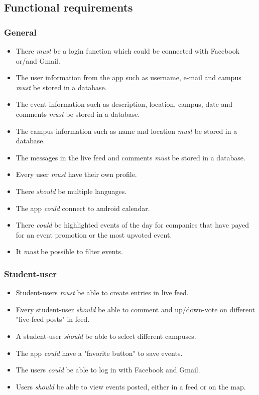 \documentclass[12pt, oneside]{article}   	%
\begin{document}
\subsection*{Functional requirements}

\subsubsection*{General}
\begin{itemize}
\item There \textit{must} be a login function which could be connected with Facebook or/and Gmail.
\item The user information from the app such as username, e-mail and campus \textit{must} be stored in a database.\item The event information such as description, location, campus, date and comments \textit{must} be stored in a database.
\item The campus information such as name and location \textit{must} be stored in a database. 
\item The messages in the live feed and comments \textit{must} be stored in a database. 
\item Every user \textit{must} have their own profile.
\item There \textit{should} be multiple languages.
\item The app \textit{could} connect to android calendar. 
\item There \textit{could} be highlighted events of the day for companies that have payed for an event promotion or the most upvoted event.
\item It \textit{must} be possible to filter events. 
\end{itemize}

\subsubsection*{Student-user}
\begin{itemize}
\item Student-users \textit{must} be able to create entries in live feed. 
\item Every student-user \textit{should} be able to comment and up/down-vote on different "live-feed posts" in feed. 
\item A student-user \textit{should} be able to select different campuses. 
\item The app \textit{could} have a "favorite button" to save events. 
\item The users \textit{could} be able to log in with Facebook and Gmail. 
\item Users \textit{should} be able to view events posted, either in a feed or on the map. 
\end{itemize}
\end{document}
